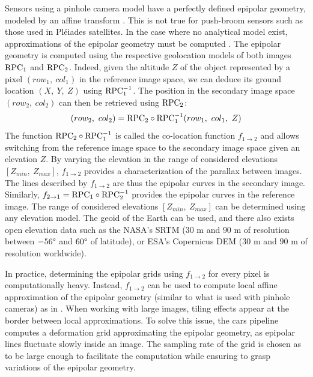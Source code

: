 Sensors using a pinhole camera model have a perfectly defined epipolar geometry, modeled by an affine transform \cite{hartley_multiple_2004}. This is not true for push-broom sensors \cite{morgan_epipolar_2004} such as those used in Pléiades satellites. In the case where no analytical model exist, approximations of the epipolar geometry must be computed \cite{oh_piecewise_2010, koh_unified_2016, michel_new_2020}. The epipolar geometry is computed using the respective geolocation models of both images $\mathrm{RPC}_1$ and $\mathrm{RPC}_2$. Indeed, given the altitude $Z$ of the object represented by a pixel $(row_1, ~col_1)$ in the reference image space, we can deduce its ground location $(X, ~Y, ~Z)$ using $\mathrm{RPC}_1^{-1}$. The position in the secondary image space $(row_2,~col_2)$ can then be retrieved using $\mathrm{RPC}_2$: 
\begin{equation}
    (row_2,~col_2) = \mathrm{RPC}_2\circ\mathrm{RPC}_1^{-1}(row_1, ~col_1, ~Z)\label{eq:epipolar_transfer}
\end{equation}
The function $\mathrm{RPC}_2\circ\mathrm{RPC}_1^{-1}$ is called the co-location function $f_{1\rightarrow 2}$ and allows switching from the reference image space to the secondary image space given an elevation $Z$. By varying the elevation in the range of considered elevations $[Z_{min},~Z_{max}]$, $f_{1\rightarrow 2}$ provides a characterization of the parallax between images. The lines described by $f_{1\rightarrow 2}$ are thus the epipolar curves in the secondary image. Similarly, $f_{2\rightarrow 1}=\mathrm{RPC}_1\circ\mathrm{RPC}_2^{-1}$ provides the epipolar curves in the reference image. The range of considered elevations $[Z_{min},~Z_{max}]$ can be determined using any elevation model. The geoid of the Earth can be used, and there also exists open elevation data such as the NASA's SRTM \cite{farr_shuttle_2007} ($30$ m and $90$ m of resolution between $-56\degree$ and $60\degree$ of latitude), or ESA's Copernicus DEM ($30$ m and $90$ m of resolution worldwide).

In practice, determining the epipolar grids using $f_{1\rightarrow 2}$ for every pixel is computationally heavy. Instead, $f_{1\rightarrow 2}$ can be used to compute local affine approximation of the epipolar geometry (similar to what is used with pinhole cameras) as in \cite{de_franchis_stereo-rectification_2014}. When working with large images, tiling effects appear at the border between local approximations. To solve this issue, the \acrshort{cars} pipeline computes a deformation grid approximating the epipolar geometry, as epipolar lines fluctuate slowly inside an image. The sampling rate of the grid is chosen as to be large enough to facilitate the computation while ensuring to grasp variations of the epipolar geometry.


